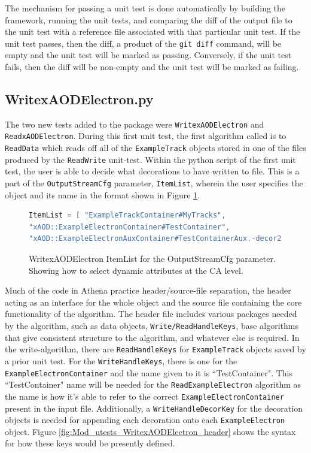 The mechanism for passing a unit test is done automatically by building the framework, running the unit tests, and comparing the diff of the output file to the unit test with a reference file associated with that particular unit test. 
If the unit test passes, then the diff, a product of the \verb|git diff| command, will be empty and the unit test will be marked as passing.
Conversely, if the unit test fails, then the diff will be non-empty and the unit test will be marked as failing.

\subsection{WritexAODElectron.py}
The two new tests added to the package were \verb|WritexAODElectron| and \verb|ReadxAODElectron|.
During this first unit test, the first algorithm called is to \verb|ReadData| which reads off all of the \verb|ExampleTrack| objects stored in one of the files produced by the \verb|ReadWrite| unit-test.
Within the python script of the first unit test, the user is able to decide what decorations to have written to file. 
This is a part of the \verb|OutputStreamCfg| parameter, \verb|ItemList|, wherein the user specifies the object and its name in the format shown in Figure \ref{fig:Mod_utests_WritexAODElectron_ItemList}. 
\begin{figure}[h]
\centering
\begin{lstlisting}[language=C]
ItemList = [ "ExampleTrackContainer#MyTracks", 
"xAOD::ExampleElectronContainer#TestContainer",
"xAOD::ExampleElectronAuxContainer#TestContainerAux.-decor2"] )
\end{lstlisting}
\caption{WritexAODElectron ItemList for the OutputStreamCfg parameter. Showing how to select dynamic attributes at the CA level.}
\label{fig:Mod_utests_WritexAODElectron_ItemList}
\end{figure}



Much of the code in Athena practice header/source-file separation, the header acting as an interface for the whole object and the source file containing the core functionality of the algorithm.
The header file includes various packages needed by the algorithm, such as data objects, \verb|Write/ReadHandleKeys|, base algorithms that give consistent structure to the algorithm, and whatever else is required. 
In the write-algorithm, there are \verb|ReadHandleKeys| for \verb|ExampleTrack| objects saved by a prior unit test. 
For the \verb|WriteHandleKeys|, there is one for the \verb|ExampleElectronContainer| and the name given to it is ``TestContainer". 
This ``TestContainer" name will be needed for the \verb|ReadExampleElectron| algorithm as the name is how it's able to refer to the correct \verb|ExampleElectronContainer| present in the input file. 
Additionally, a \verb|WriteHandleDecorKey| for the decoration objects is needed for appending each decoration onto each \verb|ExampleElectron| object. 
Figure \ref{fig:Mod_utests_WritexAODElectron_header} shows the syntax for how these keys would be presently defined.

